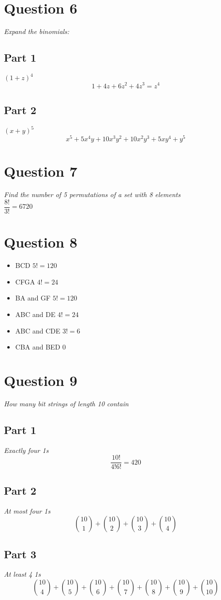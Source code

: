 \documentclass{article}[18pt]
\begin{document}
\section{Question 6}
\textit{Expand the binomials:}
\subsection{Part 1}
$(1+z)^4$\\
$$1+4z+6z^2+4z^3=z^4$$
\subsection{Part 2}
$(x+y)^5$
$$x^5+5x^4y+10x^3y^2+10x^2y^3+5xy^4+y^5$$
\section{Question 7}
\textit{Find the number of 5 permutations of a set with 8 elements}\\
$\dfrac{8!}{3!}=6720$
\section{Question 8}
\begin{itemize}
\item BCD $5!=120$
\item CFGA $4!=24$
\item BA and GF $5!=120$
\item ABC and DE $4!=24$
\item ABC and CDE $3!=6$
\item CBA and BED $0$
\end{itemize}
\section{Question 9}
\textit{How many bit strings of length 10 contain}
\subsection{Part 1}
\textit{Exactly four 1s}
$$\dfrac{10!}{4!6!}=420$$
\subsection{Part 2}
\textit{At most four 1s}\\
$$\binom{10}{1}+\binom{10}{2}+\binom{10}{3}+\binom{10}{4}$$
\subsection{Part 3}
\textit{At least 4 1s}
$$\binom{10}{4}+\binom{10}{5}+\binom{10}{6}+\binom{10}{7}+\binom{10}{8}+\binom{10}{9}+\binom{10}{10}$$
\end{document}
